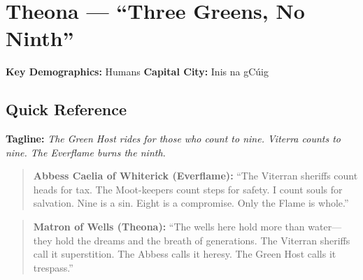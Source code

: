 \section{Theona --- ``Three Greens, No Ninth''}
\label{chap:theona}

\textbf{Key Demographics: } Humans
\textbf{Capital City: } Inis na gCúig

\subsection*{Quick Reference}
\textbf{Tagline:} \textit{The Green Host rides for those who count to nine. Viterra counts to nine. The Everflame burns the ninth.}

\begin{quote}
  \textbf{Abbess Caelia of Whiterick (Everflame):}  
  ``The Viterran sheriffs count heads for tax. The Moot-keepers count steps for safety. I count souls for salvation. Nine is a sin. Eight is a compromise. Only the Flame is whole.''
\end{quote}

\begin{quote}
  \textbf{Matron of Wells (Theona):}  
  ``The wells here hold more than water---they hold the dreams and the breath of generations. The Viterran sheriffs call it superstition. The Abbess calls it heresy. The Green Host calls it trespass.''
\end{quote}

